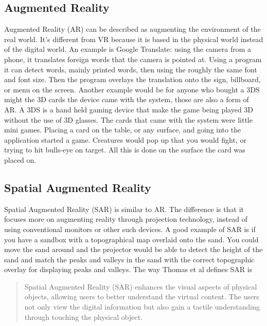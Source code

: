 \documentclass{sig-alternate}
\begin{document}
\subsection{Augmented Reality}
\label{sec:Augmented Reality}
Augmented Reality (AR) can be described as augmenting the environment of the real world. It's different from VR because it is based in the physical world instead of the digital world. An example is Google Translate: using the camera from a phone, it translates foreign words that the camera is pointed at. Using a program it can detect words, mainly printed words, then using the roughly the same font and font size. Then the program overlays the translation onto the sign, billboard, or menu on the screen. Another example would be for anyone who bought a 3DS might the 3D cards the device came with the system, those are also a form of AR. A 3DS is a hand held gaming device that make the game being played 3D without the use of 3D glasses. The cards that came with the system were little mini games. Placing a card on the table, or any surface, and going into the application started a game. Creatures would pop up that you would fight, or trying to hit bulls-eye on target. All this is done on the surface the card was placed on.     

\subsection{Spatial Augmented Reality}
\label{sec:Spatial Augmented Reality}
Spatial Augmented Reality (SAR) is similar to AR. The difference is that it focuses more on augmenting reality through projection technology, instead of using conventional monitors or other such devices. A good example of SAR is if you have a sandbox with a topographical map overlaid onto the sand. You could move the sand around and the projector would be able to detect the height of the sand and match the peaks and valleys in the sand with the correct topographic overlay for displaying peaks and valleys. The way Thomas et al \cite{3D} defines SAR is 
\begin{quote}
Spatial Augmented Reality (SAR) enhances the visual aspects of physical objects, allowing users to better understand the virtual content. The users not only view the digital information but also gain a tactile understanding through touching the physical object.
\end{quote}
\end{document}
